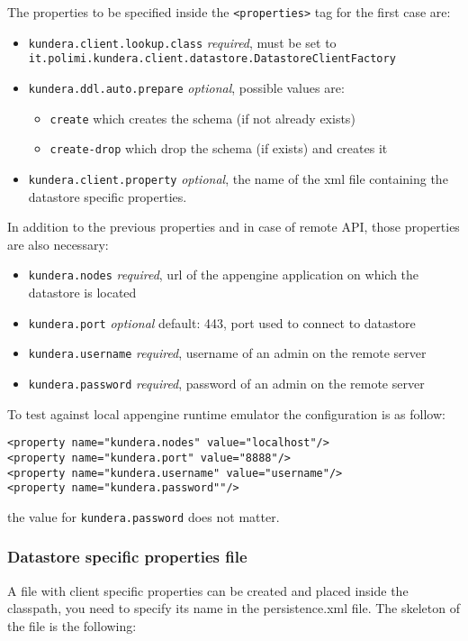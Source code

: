 \newparagraph The properties to be specified inside the \texttt{<properties>} tag for the first case are:
\begin{itemize}
\item \texttt{kundera.client.lookup.class} \textit{required}, must be set to \\ \texttt{it.polimi.kundera.client.datastore.DatastoreClientFactory}
\item \texttt{kundera.ddl.auto.prepare} \textit{optional}, possible values are:
\begin{itemize}
\item \texttt{create} which creates the schema (if not already exists)
\item \texttt{create-drop} which drop the schema (if exists) and creates it
\end{itemize}
\item \texttt{kundera.client.property} \textit{optional}, the name of the xml file containing the datastore specific properties.
\end{itemize}

\noindent In addition to the previous properties and in case of remote API, those properties are also necessary:
\begin{itemize}
\item \texttt{kundera.nodes} \textit{required}, url of the appengine application on which the datastore is located
\item \texttt{kundera.port} \textit{optional} default: 443, port used to connect to datastore
\item \texttt{kundera.username} \textit{required}, username of an admin on the remote server
\item \texttt{kundera.password} \textit{required}, password of an admin on the remote server
\end{itemize}

\noindent To test against local appengine runtime emulator the configuration is as follow:

\begin{verbatim}
<property name="kundera.nodes" value="localhost"/>
<property name="kundera.port" value="8888"/>
<property name="kundera.username" value="username"/>
<property name="kundera.password""/>
\end{verbatim}

\noindent the value for \texttt{kundera.password} does not matter.

\subsubsection{Datastore specific properties file}
A file with client specific properties can be created and placed inside the classpath, you need to specify its name in the persistence.xml file.
The skeleton of the file is the following:

